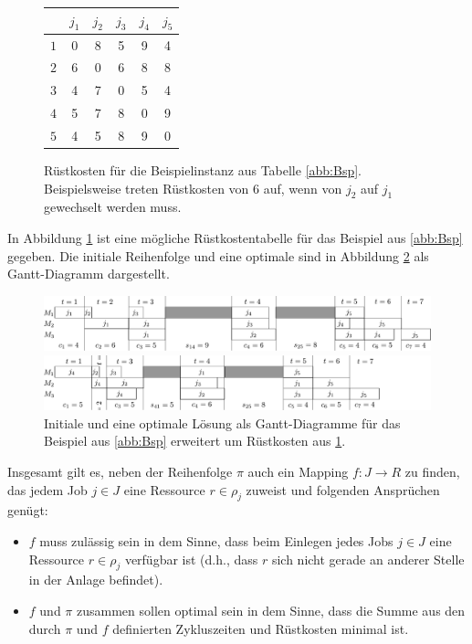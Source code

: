 \documentclass{scrreprt}
\begin{document}
\begin{figure}
    \begin{center}
        \begin{tabular}{c|ccccc}
            & $j_1$ & $j_2$ & $j_3$ & $j_4$ & $j_5$ \\ \hline
            $1$ & 0 & 8 & 5 & 9 & 4\\
            $2$ & 6 & 0 & 6 & 8 & 8\\
            $3$ & 4 & 7 & 0 & 5 & 4\\
            $4$ & 5 & 7 & 8 & 0 & 9\\
            $5$ & 4 & 5 & 8 & 9 & 0
        \end{tabular}
    \end{center}
    \caption{
        \label{abb:BspRes}
        Rüstkosten für die Beispielinstanz aus Tabelle \ref{abb:Bsp}.
        Beispielsweise treten Rüstkosten von $6$ auf, wenn von $j_2$ auf $j_1$ gewechselt werden muss.
    }
\end{figure}
In Abbildung \ref{abb:BspRes} ist eine mögliche Rüstkostentabelle für das Beispiel aus \ref{abb:Bsp} gegeben.
Die initiale Reihenfolge und eine optimale sind in Abbildung \ref{abb:ganttres} als Gantt-Diagramm dargestellt.
\begin{figure}
    \begin{center}
        \includegraphics[width=\textwidth]{graphics/bspresinit.pdf}
    \end{center}
    \begin{center}
        \includegraphics[width=\textwidth]{graphics/bspresopt.pdf}
    \end{center}
    \caption{
        \label{abb:ganttres}
        Initiale und eine optimale Lösung als Gantt-Diagramme für das Beispiel aus \ref{abb:Bsp} erweitert um Rüstkosten aus \ref{abb:BspRes}.
    }
\end{figure}

Insgesamt gilt es, neben der Reihenfolge $\pi$ auch ein Mapping $f:J\rightarrow R$ zu finden, 
das jedem Job $j\in J$ eine Ressource $r\in\rho_j$ zuweist und folgenden Ansprüchen genügt:
\begin{itemize}
    \item $f$ muss zulässig sein in dem Sinne, dass beim Einlegen jedes Jobs $j\in J$ eine Ressource $r\in\rho_j$ verfügbar ist
        (d.h., dass $r$ sich nicht gerade an anderer Stelle in der Anlage befindet).
    \item $f$ und $\pi$ zusammen sollen optimal sein in dem Sinne, dass die Summe aus den durch $\pi$ und $f$ definierten Zykluszeiten und 
        Rüstkosten minimal ist.
\end{itemize}
\end{document}
